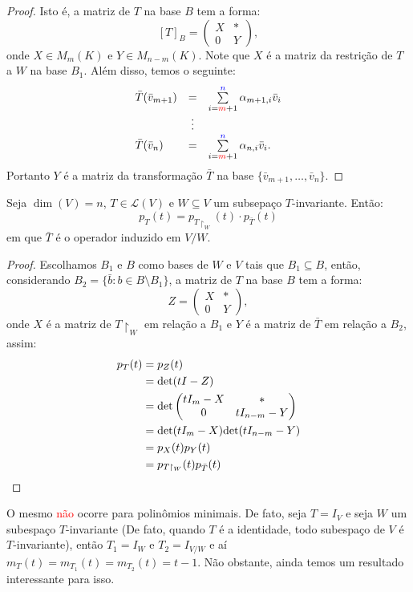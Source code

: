 \documentclass[11pt,twoside,a4paper]{book}
\begin{document}
\begin{proof}
\noindent
Isto é, a matriz de \(T\) na base \(B\) tem a forma:
\[[T]_B=\begin{pmatrix}
X & * \\ 0 & Y\end{pmatrix},\]
onde \(X\in M_m(K)\) e \(Y\in M_{n-m}(K)\). Note que \(X\) é a matriz da
restrição de \(T\) a \(W\) na base \(B_1\). Além disso, temos o seguinte:
\[
\begin{array}{lcl}
\bar{T}(\bar{v}_{m+1})&=&\sum\limits_{i={\textcolor{red}{m}}+1}^{\textcolor{blue}{n}}\alpha_{m+1,i}\bar{v}_i\\&\vdots&\\\bar{T}(\bar{v}_n)&=&\sum\limits_{i={\textcolor{red}{m}}+1}^{\textcolor{blue}{n}}\alpha_{n,i}\bar{v}_i.
\end{array}
\]
Portanto $Y$ é a matriz da transformação $\bar{T}$ na base $\{\bar{v}_{m+1},\dots,\bar{v}_n\}$.
\end{proof}

\begin{lema}
Seja $\dim(V)=n$, $T\in\mathcal{L}(V)$ e $W\subseteq V$ um subsepaço $T$-invariante. Então:
\[
p_T(t)=p_{T\upharpoonright_W}(t)\cdot p_{\bar{T}}(t)
\]
em que $\bar{T}$ é o operador induzido em $V/W$.
\end{lema}
\begin{proof}
Escolhamos $B_1$ e $B$ como bases de $W$ e $V$ tais que $B_1\subseteq B$, então, considerando $B_2=\{\bar{b}:b\in B\setminus B_1\}$, a matriz de \(T\) na base \(B\) tem a forma:
\[Z=\begin{pmatrix}
X & * \\ 0 & Y\end{pmatrix},\]
onde $X$ é a matriz de $T\upharpoonright_W$ em relação a $B_1$ e $Y$ é a matriz de $\bar{T}$ em relação a $B_2$, assim:
\begin{align*}
p_T(t)&=p_Z(t)\\
&=\det(tI-Z)\\
&=\text{det}\begin{pmatrix}
tI_m-X & * \\ 0 & tI_{n-m}-Y\end{pmatrix}\\
&=\text{det}(tI_m-X)\text{det}(tI_{n-m}-Y)\\
&=p_X(t)p_Y(t)\\
&=p_{T\upharpoonright_W}(t)p_{\bar{T}}(t)\qedhere
\end{align*}
\end{proof}

\begin{observacao}
O mesmo \textcolor{red}{não} ocorre para polinômios minimais. De fato, seja $T=I_V$ e seja $W$ um subespaço $T$-invariante (De fato, quando \(T\) é a identidade, todo subespaço de \(V\) é \(T\)-invariante), então $T_1=I_W$ e $T_2=I_{V/W}$ e aí $m_T(t)=m_{T_1}(t)=m_{T_2}(t)=t-1$. Não obstante, ainda temos um resultado interessante para isso.
\end{observacao}
\end{document}
